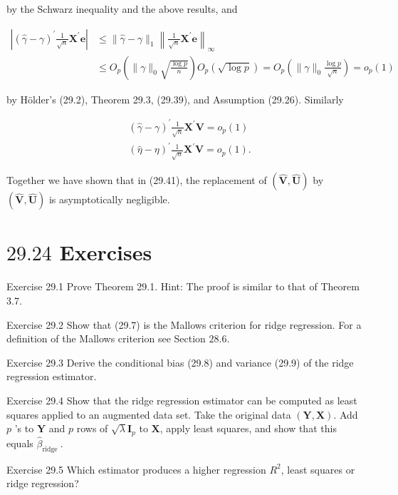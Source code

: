 \documentclass[10pt]{article}
\begin{document}
by the Schwarz inequality and the above results, and

$$
\begin{aligned}
\left|(\widehat{\gamma}-\gamma)^{\prime} \frac{1}{\sqrt{n}} \boldsymbol{X}^{\prime} \boldsymbol{e}\right| & \leq\|\widehat{\gamma}-\gamma\|_{1}\left\|\frac{1}{\sqrt{n}} \boldsymbol{X}^{\prime} \boldsymbol{e}\right\|_{\infty} \\
& \leq O_{p}\left(\|\gamma\|_{0} \sqrt{\frac{\log p}{n}}\right) O_{p}(\sqrt{\log p})=O_{p}\left(\|\gamma\|_{0} \frac{\log p}{\sqrt{n}}\right)=o_{p}(1)
\end{aligned}
$$

by Hölder's (29.2), Theorem 29.3, (29.39), and Assumption (29.26). Similarly

$$
\begin{aligned}
&(\widehat{\gamma}-\gamma)^{\prime} \frac{1}{\sqrt{n}} \boldsymbol{X}^{\prime} \boldsymbol{V}=o_{p}(1) \\
&(\widehat{\eta}-\eta)^{\prime} \frac{1}{\sqrt{n}} \boldsymbol{X}^{\prime} \boldsymbol{V}=o_{p}(1) .
\end{aligned}
$$

Together we have shown that in (29.41), the replacement of $(\widehat{\boldsymbol{V}}, \widehat{\boldsymbol{U}})$ by $(\widehat{\boldsymbol{V}}, \widehat{\boldsymbol{U}})$ is asymptotically negligible.

\section{$29.24$ Exercises}
Exercise 29.1 Prove Theorem 29.1. Hint: The proof is similar to that of Theorem 3.7.

Exercise 29.2 Show that (29.7) is the Mallows criterion for ridge regression. For a definition of the Mallows criterion see Section $28.6$.

Exercise 29.3 Derive the conditional bias (29.8) and variance (29.9) of the ridge regression estimator.

Exercise 29.4 Show that the ridge regression estimator can be computed as least squares applied to an augmented data set. Take the original data $(\boldsymbol{Y}, \boldsymbol{X})$. Add $p$ 's to $\boldsymbol{Y}$ and $p$ rows of $\sqrt{\lambda} \boldsymbol{I}_{p}$ to $\boldsymbol{X}$, apply least squares, and show that this equals $\widehat{\beta}_{\text {ridge }}$.

Exercise 29.5 Which estimator produces a higher regression $R^{2}$, least squares or ridge regression?
\end{document}

